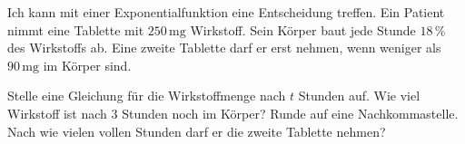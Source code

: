 \begin{aufgabe}{Ich kann mit einer Exponentialfunktion eine Entscheidung treffen. Ein Patient nimmt eine Tablette mit $250\,\text{mg}$ Wirkstoff. Sein Körper baut jede Stunde $18\,\%$ des Wirkstoffs ab. Eine zweite Tablette darf er erst nehmen, wenn weniger als $90\,\text{mg}$ im Körper sind.}
\begin{teile}
\teil Stelle eine Gleichung für die Wirkstoffmenge nach $t$ Stunden auf.
\teil Wie viel Wirkstoff ist nach $3$ Stunden noch im Körper? Runde auf eine Nachkommastelle.
\teil Nach wie vielen vollen Stunden darf er die zweite Tablette nehmen?
\end{teile}
\end{aufgabe}
